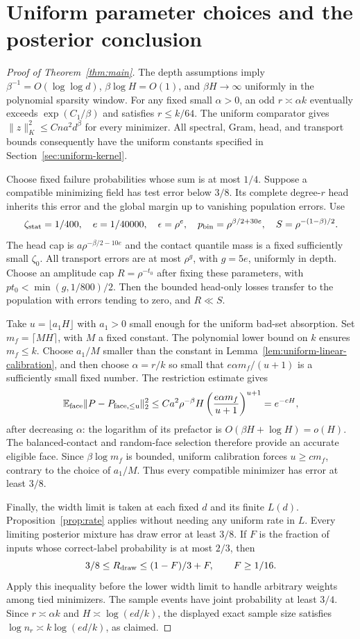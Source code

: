 \section{Uniform parameter choices and the posterior conclusion}
\label{sec:assembly}
\begin{proof}[Proof of Theorem~\ref{thm:main}]
The depth assumptions imply $\beta^{-1}=O(\log\log d)$,
$\beta\log H=O(1)$, and $\beta H\to\infty$ uniformly in the polynomial
sparsity window. For any fixed small $\alpha>0$, an odd
$r\asymp\alpha k$ eventually exceeds $\exp(C_1/\beta)$ and satisfies
$r\le k/64$. The uniform comparator gives
$\|z\|_K^2\le Cna^2d^\beta$ for every minimizer. All spectral, Gram,
head, and transport bounds consequently have the uniform constants
specified in Section~\ref{sec:uniform-kernel}.

Choose fixed failure probabilities whose sum is at most $1/4$.
Suppose a compatible minimizing field has test error below $3/8$.
Its complete degree-$r$ head inherits this error and the global margin
up to vanishing population errors. Use
\[
 \zeta_{\rm stat}=1/400,\quad e=1/40000,\quad
 \epsilon=\rho^e,\quad p_{\rm bin}=\rho^{\beta/2+30e},\quad
 S=\rho^{-(1-\beta)/2}.
\]
The head cap is $a\rho^{-\beta/2-10e}$ and the contact quantile mass
is a fixed sufficiently small $\zeta_0$. All transport errors are at
most $\rho^g$, with $g=5e$, uniformly in depth. Choose an amplitude
cap $R=\rho^{-t_0}$ after fixing these parameters, with
$pt_0<\min(g,1/800)/2$. Then the bounded head-only losses transfer to
the population with errors tending to zero, and $R\ll S$.

Take $u=\lfloor a_1H\rfloor$ with $a_1>0$ small enough for the uniform
bad-set absorption. Set $m_f=\lceil MH\rceil$, with $M$ a fixed
constant. The polynomial lower bound on $k$ ensures $m_f\le k$.
Choose $a_1/M$ smaller than the constant in
Lemma~\ref{lem:uniform-linear-calibration}, and then choose
$\alpha=r/k$ so small that $e\alpha m_f/(u+1)$ is a sufficiently small
fixed number. The restriction estimate gives
\[
 \mathbb E_{\rm face}\|P-P_{\rm face,\le u}\|_2^2
 \le Ca^2\rho^{-\beta}H
       \left(\frac{e\alpha m_f}{u+1}\right)^{u+1}
 =e^{-cH},
\]
after decreasing $\alpha$: the logarithm of its prefactor is
$O(\beta H+\log H)=o(H)$. The balanced-contact and random-face
selection therefore provide an accurate eligible face. Since
$\beta\log m_f$ is bounded, uniform calibration forces $u\ge cm_f$,
contrary to the choice of $a_1/M$.
Thus every compatible minimizer has error at least $3/8$.

Finally, the width limit is taken at each fixed $d$ and its finite
$L(d)$. Proposition~\ref{prop:rate} applies without needing any uniform
rate in $L$. Every limiting posterior mixture has draw error at least
$3/8$. If $F$ is the fraction of inputs whose correct-label probability
is at most $2/3$, then
\[
 3/8\le R_{\rm draw}\le(1-F)/3+F,
 \qquad F\ge1/16.
\]
Apply this inequality before the lower width limit to handle arbitrary
weights among tied minimizers. The sample events have joint probability
at least $3/4$. Since $r\asymp\alpha k$ and
$H\asymp\log(ed/k)$, the displayed exact sample size satisfies
$\log n_r\asymp k\log(ed/k)$, as claimed.
\end{proof}
